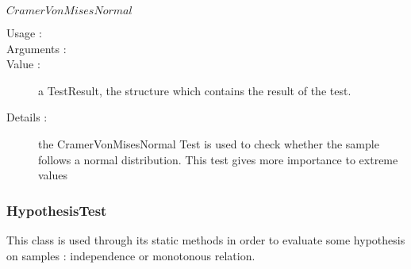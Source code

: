 \begin{description}
\begin{description}
  \item $CramerVonMisesNormal$
    \begin{description}
    \item[Usage :] \rule{0pt}{1em}
    \item[Arguments :] \rule{0pt}{1em}
    \item[Value :]  a TestResult, the structure which contains the result of the test.
    \item[Details :] the CramerVonMisesNormal Test is used to check whether the sample follows a normal distribution. This test gives more importance to extreme values
    \end{description}
  \end{description}

\end{description}




\newpage     \subsubsection{HypothesisTest}

This class is used through its static methods in order to evaluate some hypothesis on samples : independence or monotonous relation.

